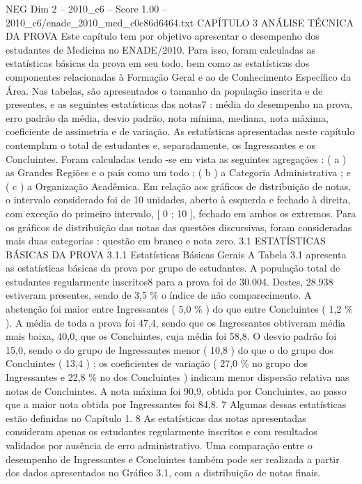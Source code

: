 \begin{textsample}{NEG Dim 2 – 2010\_c6 – Score 1.00 – 2010\_c6/enade\_2010\_med\_c0c86d6464.txt}  \label{ex:f2_neg_249}
CAPÍTULO 3 ANÁLISE TÉCNICA DA PROVA Este capítulo tem por objetivo apresentar o desempenho dos estudantes de Medicina no ENADE/2010.
Para isso, foram calculadas as estatísticas básicas da prova em seu todo, bem como as estatísticas dos componentes relacionadas à Formação Geral e ao de Conhecimento Específico da Área.
Nas tabelas, são apresentados o tamanho da população inscrita e de presentes, e as seguintes estatísticas das notas7 : média do desempenho na prova, erro padrão da média, desvio padrão, nota mínima, mediana, nota máxima, coeficiente de assimetria e de variação.
As estatísticas apresentadas neste capítulo contemplam o total de estudantes e, separadamente, os Ingressantes e os Concluintes.
Foram calculadas tendo -se em vista as seguintes agregações : ( a ) as Grandes Regiões e o país como um todo ; ( b ) a Categoria Administrativa ; e ( c ) a Organização Acadêmica.
Em relação aos gráficos de distribuição de notas, o intervalo considerado foi de 10 unidades, aberto à esquerda e fechado à direita, com exceção do primeiro intervalo, [ 0 ; 10 ], fechado em ambos os extremos.
Para os gráficos de distribuição das notas das questões discursivas, foram consideradas mais duas categorias : questão em branco e nota zero. 3.1 ESTATÍSTICAS BÁSICAS DA PROVA 3.1.1 Estatísticas Básicas Gerais A Tabela 3.1 apresenta as estatísticas básicas da prova por grupo de estudantes.
A população total de estudantes regularmente inscritos8 para a prova foi de 30.004.
Destes, 28.938 estiveram presentes, sendo de 3,5 \% o índice de não comparecimento.
A abstenção foi maior entre Ingressantes ( 5,0 \% ) do que entre Concluintes ( 1,2 \% ).
A média de toda a prova foi 47,4, sendo que os Ingressantes obtiveram média mais baixa, 40,0, que os Concluintes, cuja média foi 58,8.
O desvio padrão foi 15,0, sendo o do grupo de Ingressantes menor ( 10,8 ) do que o do grupo dos Concluintes ( 13,4 ) ; os coeficientes de variação ( 27,0 \% no grupo dos Ingressantes e 22,8 \% no dos Concluintes ) indicam menor dispersão relativa nas notas de Concluintes.
A nota máxima foi 90,9, obtida por Concluintes, ao passo que a maior nota obtida por Ingressantes foi 84,8. 7 Algumas dessas estatísticas estão definidas no Capítulo 1. 8 As estatísticas das notas apresentadas consideram apenas os estudantes regularmente inscritos e com resultados validados por ausência de erro administrativo.
Uma comparação entre o desempenho de Ingressantes e Concluintes também pode ser realizada a partir dos dados apresentados no Gráfico 3.1, com a distribuição de notas finais.

\end{textsample}
